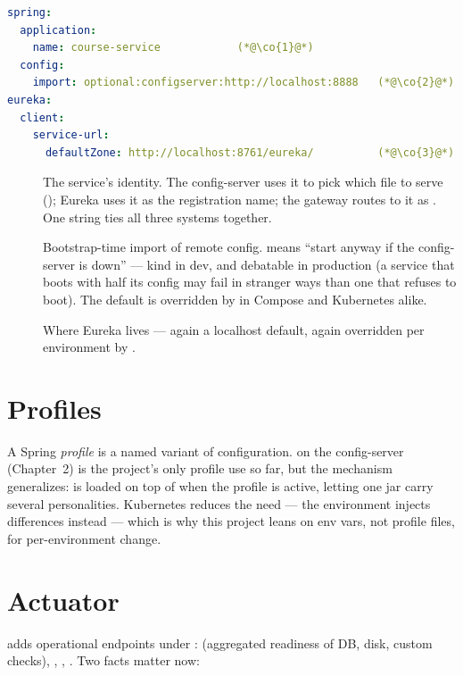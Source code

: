 \begin{lstlisting}[language=yaml]
spring:
  application:
    name: course-service            (*@\co{1}@*)
  config:
    import: optional:configserver:http://localhost:8888   (*@\co{2}@*)
eureka:
  client:
    service-url:
      defaultZone: http://localhost:8761/eureka/          (*@\co{3}@*)
\end{lstlisting}

\begin{description}
  \item[] The service's identity. The config-server uses it to pick
  which file to serve (); Eureka
  uses it as the registration name; the gateway routes to it as
  . One string ties all three systems together.
  \item[] Bootstrap-time import of remote config.
   means ``start anyway if the config-server is down'' ---
  kind in dev, and debatable in production (a service that boots with
  half its config may fail in stranger ways than one that refuses to
  boot). The  default is overridden by
   in Compose and Kubernetes alike.
  \item[] Where Eureka lives --- again a localhost default, again
  overridden per environment by .
\end{description}

\section{Profiles}

A Spring \emph{profile} is a named variant of configuration.
 on the config-server (Chapter~2) is
the project's only profile use so far, but the mechanism generalizes:
 is loaded on top of 
when the  profile is active, letting one jar carry several
personalities. Kubernetes reduces the need --- the environment injects
differences instead --- which is why this project leans on env vars, not
profile files, for per-environment change.

\section{Actuator}

 adds operational endpoints under
:  (aggregated readiness of DB, disk,
custom checks), , , .
Two facts matter now:

